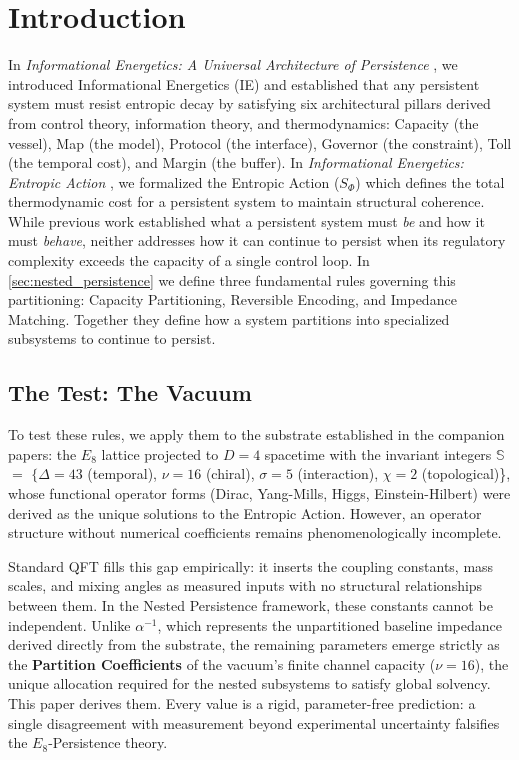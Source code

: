 \section{Introduction}

In \textit{Informational Energetics: A Universal Architecture of Persistence} \cite{meyer_informational_2026}, we introduced Informational Energetics (IE) and established that any persistent system must resist entropic decay by satisfying six architectural pillars derived from control theory, information theory, and thermodynamics: Capacity (the vessel), Map (the model), Protocol (the interface), Governor (the constraint), Toll (the temporal cost), and Margin (the buffer). In \textit{Informational Energetics: Entropic Action} \cite{meyer_ieaction_2026}, we formalized the Entropic Action ($S_\Phi$) which defines the total thermodynamic cost for a persistent system to maintain structural coherence. While previous work established what a persistent system must \textit{be} and how it must \textit{behave}, neither addresses how it can continue to persist when its regulatory complexity exceeds the capacity of a single control loop. In \cref{sec:nested_persistence} we define three fundamental rules governing this partitioning: Capacity Partitioning, Reversible Encoding, and Impedance Matching. Together they define how a system partitions into specialized subsystems to continue to persist.

\subsection{The Test: The Vacuum}

To test these rules, we apply them to the substrate established in the companion papers: the $E_8$ lattice projected to $D=4$ spacetime with the invariant integers $\mathbb{S}$ $=$ $\{\Delta{=}43$ (temporal), $\nu{=}16$ (chiral), $\sigma{=}5$ (interaction), $\chi{=}2$ (topological)\}, whose functional operator forms (Dirac, Yang-Mills, Higgs, Einstein-Hilbert) were derived as the unique solutions to the Entropic Action. However, an operator structure without numerical coefficients remains phenomenologically incomplete.

Standard QFT fills this gap empirically: it inserts the coupling constants, mass scales, and mixing angles as measured inputs with no structural relationships between them. In the Nested Persistence framework, these constants cannot be independent. Unlike $\alpha^{-1}$, which represents the unpartitioned baseline impedance derived directly from the substrate, the remaining parameters emerge strictly as the \textbf{Partition Coefficients} of the vacuum's finite channel capacity ($\nu = 16$), the unique allocation required for the nested subsystems to satisfy global solvency. This paper derives them. Every value is a rigid, parameter-free prediction: a single disagreement with measurement beyond experimental uncertainty falsifies the $E_8$-Persistence theory.


